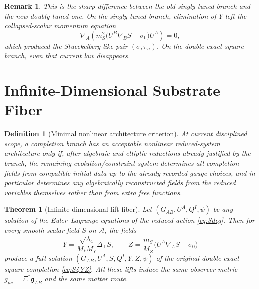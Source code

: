 \documentclass[11pt]{article}
\newcommand{\Sub}{\mathcal{A}}
\newcommand{\BridgeMetric}{\mathfrak{g}}
\newtheorem{definition}{Definition}
\newtheorem{remark}{Remark}
\newtheorem{theorem}{Theorem}
\begin{document}
\begin{remark}
This is the sharp difference between the old singly tuned branch and the new doubly tuned one. On the singly tuned branch, elimination of \(Y\) left the collapsed-scalar momentum equation
\[
\nabla_A\!\left(
m_S^2\bigl(U^B\nabla_BS-\sigma_0\bigr)U^A
\right)=0,
\]
which produced the Stueckelberg-like pair \((\sigma,\pi_\sigma)\). On the double exact-square branch, even that current law disappears.
\end{remark}

\section{Infinite-Dimensional Substrate Fiber}

\begin{definition}[Minimal nonlinear architecture criterion]
\label{def:criterion}
At current disciplined scope, a completion branch has an \emph{acceptable nonlinear reduced-system architecture} only if, after algebraic and elliptic reductions already justified by the branch, the remaining evolution/constraint system determines all completion fields from compatible initial data up to the already recorded gauge choices, and in particular determines any algebraically reconstructed fields from the reduced variables themselves rather than from extra free functions.
\end{definition}

\begin{theorem}[Infinite-dimensional lift fiber]
\label{thm:fiber}
Let \((G_{AB},U^A,Q^I,\psi)\) be any solution of the Euler--Lagrange equations of the reduced action \eqref{eq:Sdeg}. Then for every smooth scalar field \(S\) on \(\Sub\), the fields
\begin{equation}
Y
=
\frac{\sqrt{\lambda_4}}{M_*M_Y}\Delta_\perp S,
\qquad
Z
=
\frac{m_S}{M_Z}\bigl(U^A\nabla_A S-\sigma_0\bigr)
\label{eq:YZrec}
\end{equation}
produce a full solution \((G_{AB},U^A,S,Q^I,Y,Z,\psi)\) of the original double exact-square completion \eqref{eq:S4YZ}. All these lifts induce the same observer metric \(g_{\mu\nu}=\Xi^*\BridgeMetric_{AB}\) and the same matter route.
\end{theorem}
\end{document}
